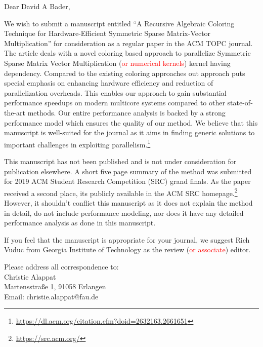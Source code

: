 \documentclass[english,10pt]{ethbrief3}
\date{June 01, 2019} %
\begin{document}

\opening{Dear David A Bader, }
We wish to submit a manuscript entitled ``A Recursive Algebraic Coloring Technique for
Hardware-Efficient Symmetric Sparse Matrix-Vector Multiplication'' for consideration as a regular
paper in the ACM TOPC journal. The article deals with a novel coloring based approach to 
parallelize Symmetric Sparse Matrix Vector Multiplication (\textcolor{red}{or numerical kernels}) 
kernel having dependency.  Compared to the existing coloring approaches out approach puts 
special emphasis on enhancing hardware efficiency and reduction of parallelization overheads.
This enables our approach to gain substantial performance speedups on modern multicore systems
compared to other state-of-the-art methods. Our entire performance analysis is backed by a strong 
performance model which ensures the quality of our method.
We believe that this manuscript is well-suited for the journal as it aims in finding
generic solutions to important challenges in exploiting parallelism.\footnote{\href{https://dl.acm.org/citation.cfm?doid=2632163.2661651}{https://dl.acm.org/citation.cfm?doid=2632163.2661651}}

This manuscript has not been published and is not under consideration for publication elsewhere.
A short five page summary of the method was submitted for 2019 ACM Student Research Competition (SRC) grand finals. 
As the paper received a second place, its publicly available in the ACM SRC homepage.\footnote{\href{https://src.acm.org/}{https://src.acm.org/}}
 However, it shouldn't conflict this manuscript as it does not explain
the method in detail, do not include performance modeling, nor does it have any
 detailed performance analysis as done in this manuscript.

If you feel that the manuscript is appropriate for your journal, we suggest Rich Vuduc 
from Georgia Institute of Technology as the review (\textcolor{red}{or associate}) editor.

Please address all correspondence to:\\
\vspace{1em}
Christie Alappat\\
Martensstraße 1, 91058 Erlangen\\
Email: christie.alappat@fau.de\\
\vspace{1em}
\end{document}
